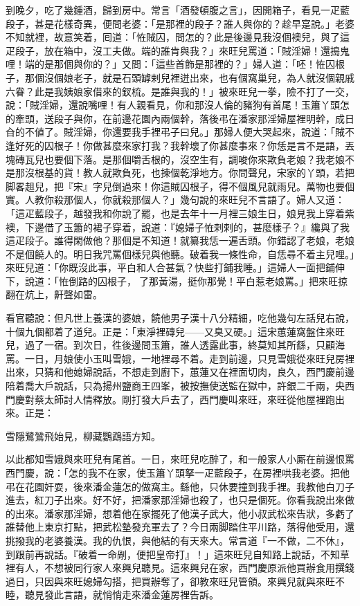 到晚夕，吃了幾鍾酒，歸到房中。常言「酒發頓腹之言」，因開箱子，看見一疋藍段子，甚是花樣奇異，便問老婆：「是那裡的段子？誰人與你的？趁早寔說。」老婆不知就裡，故意笑着，囘道：「恠賊囚，問怎的？此是後邊見我沒個襖兒，與了這疋段子，放在箱中，沒工夫做。端的誰肯與我？」來旺兒罵道：「賊淫婦！還搗鬼哩！端的是那個與你的？」又問：「這些首飾是那裡的？」婦人道：「呸！恠囚根子，那個沒個娘老子，就是石頭罅剌兒裡迸出來，也有個窩巢兒，為人就沒個親戚六眷？此是我姨娘家借來的釵梳。是誰與我的！」被來旺兒一拳，險不打了一交，{}說：「賊淫婦，還說嘴哩！有人親看見，你和那沒人倫的豬狗有首尾！玉簫丫頭怎的牽頭，送段子與你，在前邊花園內兩個幹，落後弔在潘家那淫婦屋裡明幹，成日㒲的不値了。賊淫婦，你還要我手裡弔子曰兒。」那婦人便大哭起來，說道：「賊不逢好死的囚根子！你做甚麼來家打我？我幹壞了你甚麼事來？你恁是言不是語，丟塊磚瓦兒也要個下落。是那個嚼舌根的，沒空生有，調唆你來欺負老娘？{}我老娘不是那沒根基的貨！教人就欺負死，也揀個乾淨地方。你問聲兒，宋家的丫頭，若把脚畧趄兒，把『宋』字兒倒過來！你這賊囚根子，得不個風兒就雨兒。萬物也要個實。人教你殺那個人，你就殺那個人？」幾句說的來旺兒不言語了。婦人又道：「這疋藍段子，越發我和你說了罷，也是去年十一月裡三娘生日，娘見我上穿着紫襖，下邊借了玉簫的裙子穿着，說道：『媳婦子恠剌剌的，甚麼樣子？』纔與了我這疋段子。誰得閑做他？那個是不知道！就纂我恁一遍舌頭。你錯認了老娘，老娘不是個饒人的。明日我咒罵個樣兒與他聽。破着我一條性命，自恁尋不着主兒哩。」{}來旺兒道：「你既沒此事，{}平白和人合甚氣？{}快些打鋪我睡。」這婦人一面把鋪伸下，說道：「恠倒路的囚根子，𠳹了那黃湯，挺你那覺！平白惹老娘罵。」把來旺掠翻在炕上，鼾聲如雷。

看官聽說：但凡世上養漢的婆娘，饒他男子漢十八分精細，吃他幾句左話兒右說，十個九個都着了道兒。正是：「東淨裡磚兒——又臭又硬。」這宋蕙蓮窩盤住來旺兒，過了一宿。到次日，徃後邊問玉簫，誰人透露此事，終莫知其所繇，只顧海罵。一日，月娘使小玉叫雪娥，一地裡尋不着。走到前邊，只見雪娥從來旺兒房裡出來，只猜和他媳婦說話，不想走到廚下，蕙蓮又在裡面切肉，良久，西門慶前邊陪着喬大戶說話，只為揚州鹽商王四峯，被按撫使送監在獄中，許銀二千兩，央西門慶對蔡太師討人情釋放。剛打發大戶去了，西門慶叫來旺，來旺從他屋裡跑出來。正是：

\begin{myquote}
雪隱鷺鷥飛始見，柳藏鸚鵡語方知。
\end{myquote}

以此都知雪娥與來旺兒有尾首。一日，來旺兒吃醉了，和一般家人小厮在前邊恨罵西門慶，說：「怎的我不在家，使玉簫丫頭拏一疋藍段子，在房裡哄我老婆。把他弔在花園奸耍，後來潘金蓮怎的做窩主。繇他，只休要撞到我手裡。我教他白刀子進去，紅刀子出來。好不好，把潘家那淫婦也殺了，也只是個死。你看我說出來做的出來。潘家那淫婦，想着他在家擺死了他漢子武大，他小叔武松來告狀，多虧了誰替他上東京打點，把武松墊發充軍去了？今日兩脚踏住平川路，落得他受用，還挑撥我的老婆養漢。我的仇恨，與他結的有天來大。常言道『一不做，二不休』，到跟前再說話。『破着一命剮，便把皇帝打』！」{}這來旺兒自知路上說話，不知草裡有人，不想被同行家人來興兒聽見。這來興兒在家，西門慶原派他買辦食用撰錢過日，只因與來旺媳婦勾搭，把買辦奪了，卻教來旺兒管領。來興兒就與來旺不睦，聽見發此言語，就悄悄走來潘金蓮房裡告訴。

